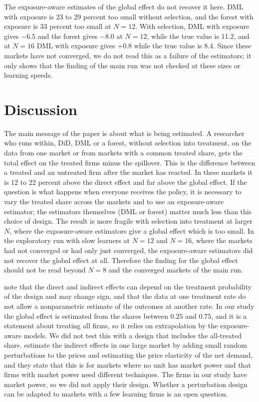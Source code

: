 \documentclass[11pt]{article}
\begin{document}
The exposure-aware estimates of the global effect do not recover it here. DML with exposure is 23 to 29 percent too small without selection, and the forest with exposure is 33 percent too small at $N=12$. With selection, DML with exposure gives $-6.5$ and the forest gives $-8.0$ at $N=12$, while the true value is 11.2, and at $N=16$ DML with exposure gives $+0.8$ while the true value is 8.4. Since these markets have not converged, we do not read this as a failure of the estimators; it only shows that the finding of the main run was not checked at these sizes or learning speeds.

\section{Discussion}
The main message of the paper is about what is being estimated. A researcher who runs within, DiD, DML or a forest, without selection into treatment, on the data from one market or from markets with a common treated share, gets the total effect on the treated firms minus the spillover. This is the difference between a treated and an untreated firm after the market has reacted. In these markets it is 12 to 22 percent above the direct effect and far above the global effect. If the question is what happens when everyone receives the policy, it is necessary to vary the treated share across the markets and to use an exposure-aware estimator; the estimators themselves (DML or forest) matter much less than this choice of design. The result is more fragile with selection into treatment at larger $N$, where the exposure-aware estimators give a global effect which is too small. In the exploratory run with slow learners at $N=12$ and $N=16$, where the markets had not converged or had only just converged, the exposure-aware estimators did not recover the global effect at all. Therefore the finding for the global effect should not be read beyond $N=8$ and the converged markets of the main run.

\citet{hu2022} note that the direct and indirect effects can depend on the treatment probability of the design and may change sign, and that the data at one treatment rate do not allow a nonparametric estimate of the outcomes at another rate. In our study the global effect is estimated from the shares between $0.25$ and $0.75$, and it is a statement about treating all firms, so it relies on extrapolation by the exposure-aware models. We did not test this with a design that includes the all-treated share. \citet{mkw2025} estimate the indirect effects in one large market by adding small random perturbations to the prices and estimating the price elasticity of the net demand, and they state that this is for markets where no unit has market power and that firms with market power need different techniques. The firms in our study have market power, so we did not apply their design. Whether a perturbation design can be adapted to markets with a few learning firms is an open question.
\end{document}

